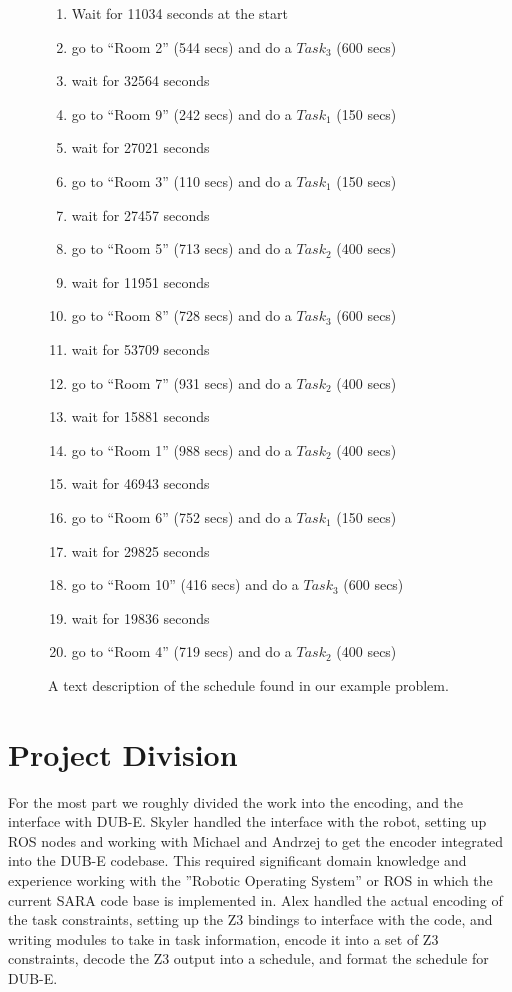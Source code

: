 \documentclass[11pt]{article}
\begin{document}
\begin{figure}
  \begin{enumerate}
    \item Wait for 11034 seconds at the start
    \item go to ``Room 2'' (544 secs) and do a $Task_3$ (600 secs)
    \item wait for 32564 seconds
    \item go to ``Room 9'' (242 secs) and do a $Task_1$ (150 secs)
    \item wait for 27021 seconds
    \item go to ``Room 3'' (110 secs) and do a $Task_1$ (150 secs)
    \item wait for 27457 seconds
    \item go to ``Room 5'' (713 secs) and do a $Task_2$ (400 secs)
    \item wait for 11951 seconds
    \item go to ``Room 8'' (728 secs) and do a $Task_3$ (600 secs)
    \item wait for 53709 seconds
    \item go to ``Room 7'' (931 secs) and do a $Task_2$ (400 secs)
    \item wait for 15881 seconds
    \item go to ``Room 1'' (988 secs) and do a $Task_2$ (400 secs)
    \item wait for 46943 seconds
    \item go to ``Room 6'' (752 secs) and do a $Task_1$ (150 secs)
    \item wait for 29825 seconds
    \item go to ``Room 10'' (416 secs) and do a $Task_3$ (600 secs)
    \item wait for 19836 seconds
    \item go to ``Room 4'' (719 secs) and do a $Task_2$ (400 secs)
  \end{enumerate}
  \caption{
    A text description of the schedule found in our example problem.
  }
  \label{fig:text-schedule}
\end{figure}

\section{Project Division}
For the most part we roughly divided the work into the encoding,
and the interface with DUB-E.
Skyler handled the interface with the robot,
setting up ROS nodes and working with Michael and Andrzej
to get the encoder integrated
into the DUB-E codebase. This required significant
domain knowledge and experience working with the
''Robotic Operating System'' or ROS in which the
current SARA code base is implemented in.
Alex handled the actual encoding of the task constraints,
setting up the Z3 bindings to interface with the code,
and writing modules to take in task information,
encode it into a set of Z3 constraints,
decode the Z3 output into a schedule,
and format the schedule for DUB-E.
\end{document}
